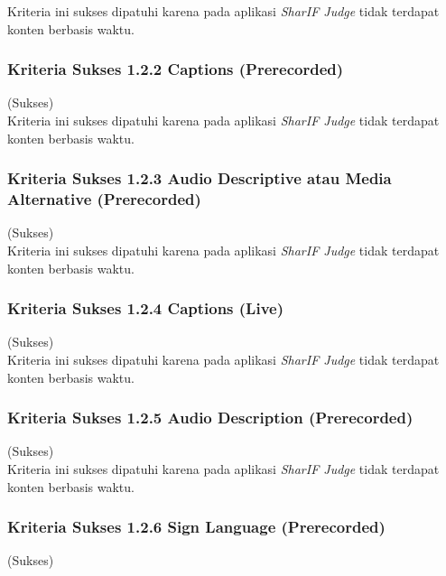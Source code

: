 \documentclass[a4paper,twoside]{article}
\begin{document}
\begin{enumerate}
		Kriteria ini sukses dipatuhi karena pada aplikasi \textit{SharIF Judge} tidak terdapat konten berbasis waktu.
		
		\subsubsection*{Kriteria Sukses 1.2.2 Captions (Prerecorded)}
		\label{subsubsec:kepatuhan_kriteria_1.2.2}
		(Sukses) \\
		
		Kriteria ini sukses dipatuhi karena pada aplikasi \textit{SharIF Judge} tidak terdapat konten berbasis waktu.
		
		\subsubsection*{Kriteria Sukses 1.2.3 Audio Descriptive atau Media Alternative (Prerecorded)}
		\label{subsubsec:kepatuhan_kriteria_1.2.3}
		(Sukses) \\
		
		Kriteria ini sukses dipatuhi karena pada aplikasi \textit{SharIF Judge} tidak terdapat konten berbasis waktu.
		
		\subsubsection*{Kriteria Sukses 1.2.4 Captions (Live)}
		\label{subsubsec:kepatuhan_kriteria_1.2.4}
		(Sukses) \\
		
		Kriteria ini sukses dipatuhi karena pada aplikasi \textit{SharIF Judge} tidak terdapat konten berbasis waktu.
		
		\subsubsection*{Kriteria Sukses 1.2.5 Audio Description (Prerecorded)}
		\label{subsubsec:kepatuhan_kriteria_1.2.5}
		(Sukses) \\
		
		Kriteria ini sukses dipatuhi karena pada aplikasi \textit{SharIF Judge} tidak terdapat konten berbasis waktu.
		
		\subsubsection*{Kriteria Sukses 1.2.6 Sign Language (Prerecorded)}
		\label{subsubsec:kepatuhan_kriteria_1.2.6}
		(Sukses) \\
		

\end{enumerate}
\end{document}
